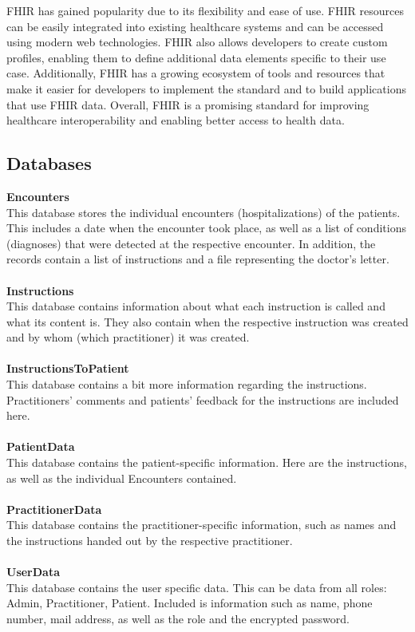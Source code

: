 \documentclass[]{report}
\begin{document}
FHIR has gained popularity due to its flexibility and ease of use. FHIR resources can be easily integrated into existing healthcare systems and can be accessed using modern web technologies. FHIR also allows developers to create custom profiles, enabling them to define additional data elements specific to their use case. Additionally, FHIR has a growing ecosystem of tools and resources that make it easier for developers to implement the standard and to build applications that use FHIR data. Overall, FHIR is a promising standard for improving healthcare interoperability and enabling better access to health data.

\subsection{Databases}
\textbf{Encounters}\\
This database stores the individual encounters (hospitalizations) of the patients. This includes a date when the encounter took place, as well as a list of conditions (diagnoses) that were detected at the respective encounter. In addition, the records contain a list of instructions and a file representing the doctor's letter.\\\\
\textbf{Instructions}\\
This database contains information about what each instruction is called and what its content is. They also contain when the respective instruction was created and by whom (which practitioner) it was created.\\\\
\textbf{InstructionsToPatient}\\
This database contains a bit more information regarding the instructions. Practitioners' comments and patients' feedback for the instructions are included here.\\\\
\textbf{PatientData}\\
This database contains the patient-specific information. Here are the instructions, as well as the individual Encounters contained.\\\\
\textbf{PractitionerData}\\
This database contains the practitioner-specific information, such as names and the instructions handed out by the respective practitioner.\\\\
\textbf{UserData}\\
This database contains the user specific data. This can be data from all roles: Admin, Practitioner, Patient. Included is information such as name, phone number, mail address, as well as the role and the encrypted password.
\end{document}
